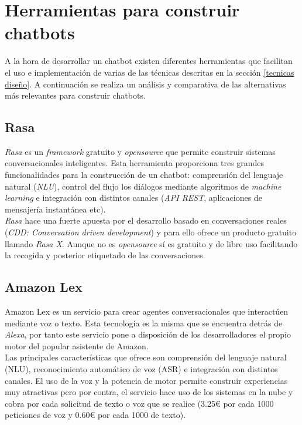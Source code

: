 \section{Herramientas para construir chatbots} \label{herramientas construir chatbots}
A la hora de desarrollar un chatbot existen diferentes herramientas que facilitan el uso e implementación de varias de las técnicas descritas en la sección \ref{tecnicas diseño}. A continuación se realiza un análisis y comparativa de las alternativas más relevantes para construir chatbots.\\

\subsection{Rasa}
\textit{Rasa} es un \textit{framework} gratuito y \textit{opensource} que permite construir sistemas conversacionales inteligentes. Esta herramienta proporciona tres grandes funcionalidades para la construcción de un chatbot: comprensión del lenguaje natural (\textit{NLU}), control del flujo los diálogos mediante algoritmos de \textit{machine learning} e integración con distintos canales (\textit{API REST}, aplicaciones de mensajería instantánea etc).\\

\textit{Rasa} hace una fuerte apuesta por el desarrollo basado en conversaciones reales (\textit{CDD: Conversation driven development}) y para ello ofrece un producto gratuito llamado \textit{Rasa X}. Aunque no es \textit{opensource} sí es gratuito y de libre uso facilitando la recogida y posterior etiquetado de las conversaciones.\\

\subsection{Amazon Lex}
Amazon Lex es un servicio para crear agentes conversacionales que interactúen mediante voz o texto. Esta tecnología es la misma que se encuentra detrás de \textit{Alexa}, por tanto este servicio pone a disposición de los desarrolladores el propio motor del popular asistente de Amazon.\\

Las principales características que ofrece son comprensión del lenguaje natural (NLU), reconocimiento automático de voz (ASR) e integración con distintos canales. El uso de la voz y la potencia de motor permite construir experiencias muy atractivas pero por contra, el servicio hace uso de los sistemas en la nube y cobra por cada solicitud de texto o voz que se realice (3.25€ por cada 1000 peticiones de voz y 0.60€ por cada 1000 de texto).\\

